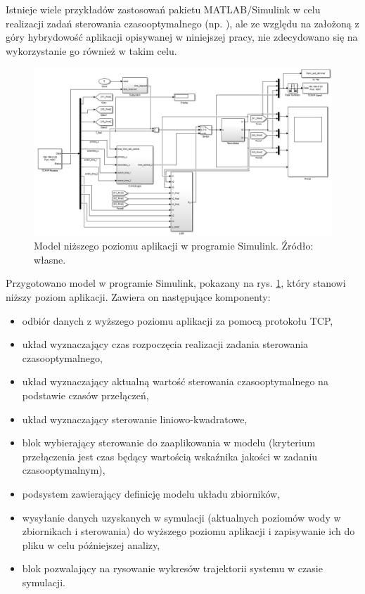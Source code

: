 Istnieje wiele przykładów zastosowań pakietu MATLAB/Simulink w celu realizacji zadań sterowania czasooptymalnego (np. \cite{Trawinski2011}), ale ze względu na założoną z góry hybrydowość aplikacji opisywanej w niniejszej pracy, nie zdecydowano się na wykorzystanie go również w takim celu.

\begin{figure}
    \centering
    \includegraphics[scale=0.65,angle=90]{Grafika/simulink_model}
    \caption{Model niższego poziomu aplikacji w programie Simulink. Źródło: własne.}
    \label{fig:simulinkmodel}
\end{figure}

Przygotowano model w programie Simulink, pokazany na rys. \ref{fig:simulinkmodel}, który stanowi niższy poziom aplikacji. Zawiera on następujące komponenty:
\begin{itemize}
    \item odbiór danych z wyższego poziomu aplikacji za pomocą protokołu TCP,
    \item układ wyznaczający czas rozpoczęcia realizacji zadania sterowania czasooptymalnego,
    \item układ wyznaczający aktualną wartość sterowania czasooptymalnego na podstawie czasów przełączeń,
    \item układ wyznaczający sterowanie liniowo-kwadratowe,
    \item blok wybierający sterowanie do zaaplikowania w modelu (kryterium przełączenia jest czas będący wartością wskaźnika jakości w zadaniu czasooptymalnym),
    \item podsystem zawierający definicję modelu układu zbiorników,
    \item wysyłanie danych uzyskanych w symulacji (aktualnych poziomów wody w zbiornikach i sterowania) do wyższego poziomu aplikacji i zapisywanie ich do pliku w celu późniejszej analizy,
    \item blok pozwalający na rysowanie wykresów trajektorii systemu w czasie symulacji.
\end{itemize}

